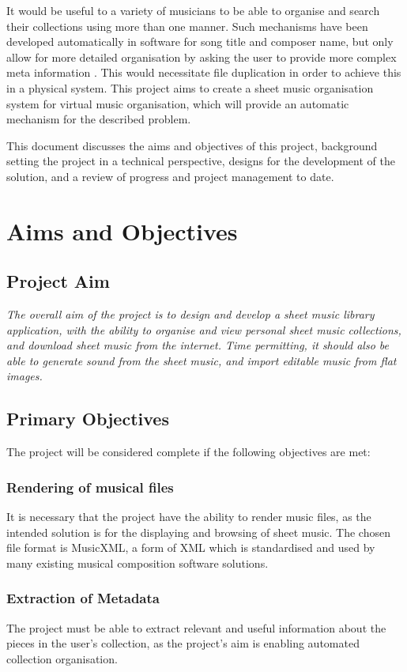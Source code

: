\documentclass[bibtotocnumbered]{article}
\begin{document}
It would be useful to a variety of musicians to be able to organise and search their collections using more than one manner. Such mechanisms have been developed automatically in software for song title and composer name, but only allow for more detailed organisation by asking the user to provide more complex meta information \parencite{calypso}. This would necessitate file duplication in order to achieve this in a physical system. This project aims to create a sheet music organisation system for virtual music organisation, which will provide an automatic mechanism for the described problem.

This document discusses the aims and objectives of this project, background setting the project in a technical perspective, designs for the development of the solution, and a review of progress and project management to date. 
\pagebreak
\section{Aims and Objectives}
\subsection{Project Aim}
\begin{center}
\textit{The overall aim of the project is to design and develop a sheet music library application, with the ability to organise and view personal sheet music collections, and download sheet music from the internet. Time permitting, it should also be able to generate sound from the sheet music, and import editable music from flat images.}
\end{center}
\subsection{Primary Objectives}
The project will be considered complete if the following objectives are met:
\subsubsection{Rendering of musical files}
It is necessary that the project have the ability to render music files, as the intended solution is for the displaying and browsing of sheet music. The chosen file format is MusicXML, a form of XML which is standardised and used by many existing musical composition software solutions.
\subsubsection{Extraction of Metadata}
The project must be able to extract relevant and useful information about the pieces in the user's collection, as the project's aim is enabling automated collection organisation. 
\end{document}

